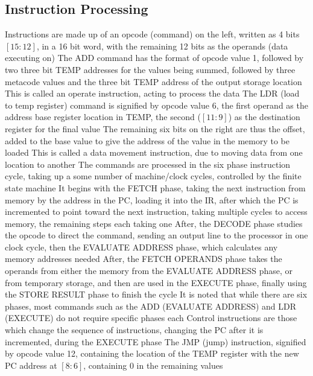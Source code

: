 \documentclass[11 pt, twoside]{article}
\newenvironment{outline*}
{
	\begin{outline}[enumerate]
	}
	{\end{outline}
}
\begin{document}
\subsection{Instruction Processing}
\begin{outline*}
\1 Instructions are made up of an opcode (command) on the left, written as 4 bits $[15:12]$, in a 16 bit word, with the remaining 12 bits as the operands (data executing on)
\2 The ADD command has the format of opcode value 1, followed by two three bit TEMP addresses for the values being summed, followed by three metacode values and the three bit TEMP address of the output storage location
\3 This is called an operate instruction, acting to process the data
\2 The LDR (load to temp register) command is signified by opcode value 6, the first operand as the address base register location in TEMP, the second ($[11:9]$) as the destination register for the final value
\3 The remaining six bits on the right are thus the offset, added to the base value to give the address of the value in the memory to be loaded
\3 This is called a data movement instruction, due to moving data from one location to another
\1 The commands are processed in the six phase instruction cycle, taking up a some number of machine/clock cycles, controlled by the finite state machine
\2 It begins with the FETCH phase, taking the next instruction from memory by the address in the PC, loading it into the IR, after which the PC is incremented to point toward the next instruction, taking multiple cycles to access memory, the remaining steps each taking one
\2 After, the DECODE phase studies the opcode to direct the command, sending an output line to the processor in one clock cycle, then the EVALUATE ADDRESS phase, which calculates any memory addresses needed
\2 After, the FETCH OPERANDS phase takes the operands from either the memory from the EVALUATE ADDRESS phase, or from temporary storage, and then are used in the EXECUTE phase, finally using the STORE RESULT phase to finish the cycle
\2 It is noted that while there are six phases, most commands such as the ADD (EVALUATE ADDRESS) and LDR (EXECUTE) do not require specific phases each
\1 Control instructions are those which change the sequence of instructions, changing the PC after it is incremented, during the EXECUTE phase
\2 The JMP (jump) instruction, signified by opcode value 12, containing the location of the TEMP register with the new PC address at $[8:6]$, containing 0 in the remaining values
\end{outline*}
\end{document}
